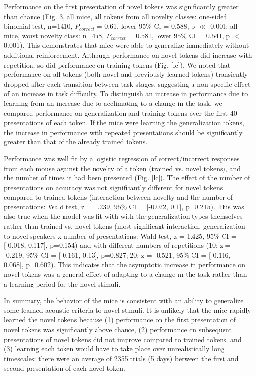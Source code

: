 Performance on the first presentation of novel tokens was significantly greater than chance (Fig. 3, all mice, all tokens from all novelty classes: one-sided binomial test, n=1410, $P_{correct}$ = 0.61, lower 95\% CI = 0.588, p $\ll$ 0.001; all mice, worst novelty class:  n=458, $P_{correct}$ = 0.581, lower 95\% CI = 0.541, p $<$ 0.001). This demonstrates that mice were able to generalize immediately without additional reinforcement. Although performance on novel tokens did increase with repetition, so did performance on training tokens (Fig. \ref{lc}). We noted that performance on all tokens (both novel and previously learned tokens) transiently dropped after each transition between task stages, suggesting a non-specific effect of an increase in task difficulty. To distinguish an increase in performance due to learning from an increase due to acclimating to a change in the task, we compared performance on generalization and training tokens over the first 40 presentations of each token. If the mice were learning the generalization tokens, the increase in performance with repeated presentations should be significantly greater than that of the already trained tokens.

Performance was well fit by a logistic regression of correct/incorrect responses from each mouse against the novelty of a token (trained vs. novel tokens), and the number of times it had been presented (Fig. \ref{lc}). The effect of the number of presentations on accuracy was not significantly different for novel tokens compared to trained tokens (interaction between novelty and the number of presentations: Wald test, z = 1.239, 95\% CI = [-0.022, 0.1], p=0.215). This was also true when the model was fit with with the generalization types themselves rather than trained vs. novel tokens (most significant interaction, generalization to novel speakers x number of presentations: Wald test, z = 1.425, 95\% CI = [-0.018, 0.117], p=0.154) and with different numbers of repetitions (10: z = -0.219, 95\% CI = [-0.161, 0.13], p=0.827; 20: z = -0.521, 95\% CI = [-0.116, 0.068], p=0.602). This indicates that the asymptotic increase in performance on novel tokens was a general effect of adapting to a change in the task rather than a learning period for the novel stimuli.

In summary, the behavior of the mice is consistent with an ability to generalize some learned acoustic criteria to novel stimuli. It is unlikely that the mice rapidly learned the novel tokens because (1) performance on the first presentation of novel tokens was significantly above chance, (2) performance on subsequent presentations of novel tokens did not improve compared to trained tokens, and (3) learning each token would have to take place over unrealistically long timescales: there were an average of 2355 trials (5 days) between the first and second presentation of each novel token.

